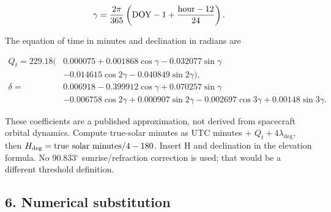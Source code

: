 \documentclass[10pt,a4paper]{article}
\numberwithin{equation}{section}
\begin{document}
\begin{equation}\gamma=\frac{2\pi}{365}\left({\rm DOY}-1+\frac{{\rm hour}-12}{24}\right).\label{eq:ch8-4}\end{equation}

\begin{sloppypar}The equation of time in minutes and declination in radians are\end{sloppypar}


\begin{equation}\begin{aligned}
Q_t=229.18(&0.000075+0.001868\cos\gamma-0.032077\sin\gamma\\
&-0.014615\cos2\gamma-0.040849\sin2\gamma),\\
\delta={}&0.006918-0.399912\cos\gamma+0.070257\sin\gamma\\
&-0.006758\cos2\gamma+0.000907\sin2\gamma
-0.002697\cos3\gamma+0.00148\sin3\gamma.
\end{aligned}\label{eq:ch8-5}\end{equation}

\begin{sloppypar}These coefficients are a published approximation, not derived from spacecraft orbital dynamics. Compute true-solar minutes as UTC minutes + \(Q_t+4\lambda_{\deg}\), then \(H_{\deg}={\rm true\ solar\ minutes}/4-180\). Insert H and declination in the elevation formula. No 90.833\ensuremath{{}^{\circ}} sunrise/refraction correction is used; that would be a different threshold definition.\end{sloppypar}


\subsection*{6. Numerical substitution}
\end{document}
